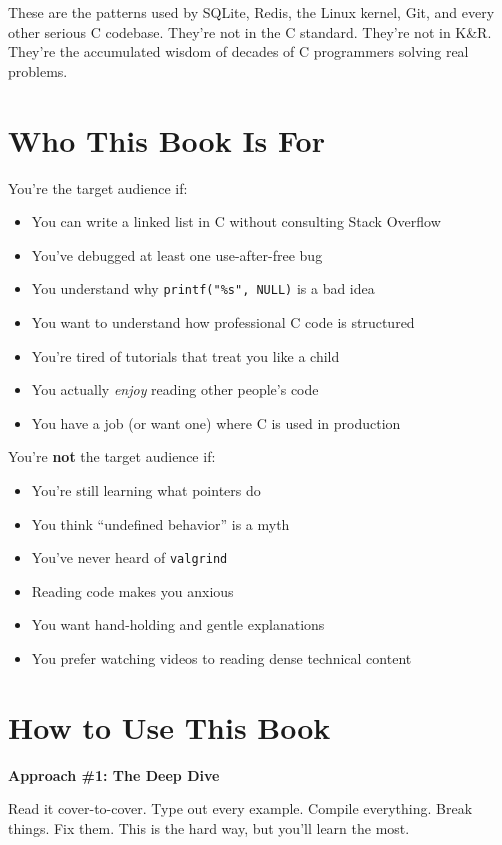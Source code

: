 \documentclass[10pt,openany]{book}
\begin{document}
These are the patterns used by SQLite, Redis, the Linux kernel, Git, and every other serious C codebase. They're not in the C standard. They're not in K\&R. They're the accumulated wisdom of decades of C programmers solving real problems.

\section*{Who This Book Is For}

You're the target audience if:
\begin{itemize}
    \item You can write a linked list in C without consulting Stack Overflow
    \item You've debugged at least one use-after-free bug
    \item You understand why \texttt{printf("\%s", NULL)} is a bad idea
    \item You want to understand how professional C code is structured
    \item You're tired of tutorials that treat you like a child
    \item You actually \textit{enjoy} reading other people's code
    \item You have a job (or want one) where C is used in production
\end{itemize}

You're \textbf{not} the target audience if:
\begin{itemize}
    \item You're still learning what pointers do
    \item You think ``undefined behavior'' is a myth
    \item You've never heard of \texttt{valgrind}
    \item Reading code makes you anxious
    \item You want hand-holding and gentle explanations
    \item You prefer watching videos to reading dense technical content
\end{itemize}

\section*{How to Use This Book}

\textbf{Approach \#1: The Deep Dive}

Read it cover-to-cover. Type out every example. Compile everything. Break things. Fix them. This is the hard way, but you'll learn the most.
\end{document}
